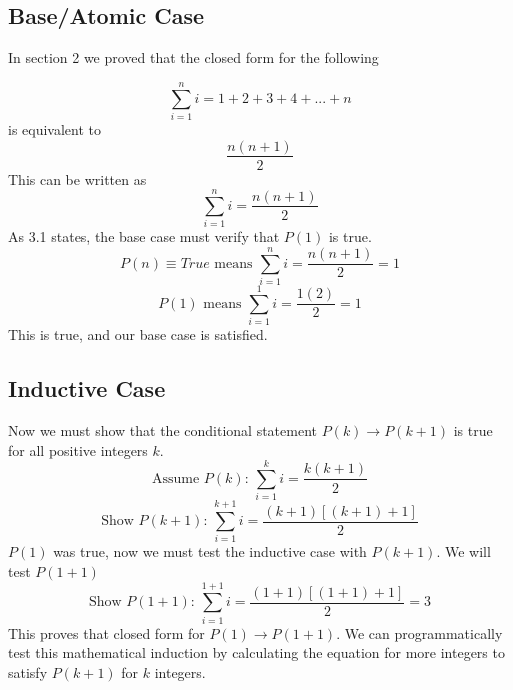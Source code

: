 \documentclass{article}
\begin{document}
\subsection{Base/Atomic Case}
In section 2 we proved that the closed form for the following

\begin{equation}
\sum_{i=1}^{n} i = 1 + 2 + 3 + 4 + ... + n
\end{equation}
\newline
is equivalent to
\begin{equation}
\frac{n(n+1)}{2}
\end{equation}
\newline
This can be written as 
\begin{equation}
\sum_{i=1}^{n} i = \frac{n(n+1)}{2}
\end{equation}
\newline
As 3.1 states, the base case must verify that $P(1)$ is true.
\newline
\newline
\begin{equation}
P(n) \equiv True \textrm{  means } \sum_{i=1}^{n} i = \frac{n(n+1)}{2} = 1
\end{equation}
\newline
\newline
\begin{equation}
P(1) \textrm{  means } \sum_{i=1}^{1} i = \frac{1(2)}{2} = 1
\end{equation}
\newline
\newline
This is true, and our base case is satisfied.

\subsection{Inductive Case}
Now we must show that the conditional statement $P(k) \rightarrow P(k+1)$ is true for all positive integers $k$.
\newline
\newline
\begin{equation}
\textrm{Assume  } P(k)\textrm{:   } \sum_{i=1}^{k} i = \frac{k(k+1)}{2}
\end{equation}
\newline
\newline
\begin{equation}
\textrm{Show  } P(k+1)\textrm{:   } \sum_{i=1}^{k+1} i = \frac{(k+1)[(k+1)+1]}{2}
\end{equation}
\newline
\newline
$P(1)$ was true, now we must test the inductive case with $P(k+1)$. We will test $P(1+1)$
\begin{equation}
\textrm{Show  } P(1+1)\textrm{:   } \sum_{i=1}^{1+1} i = \frac{(1+1)[(1+1)+1]}{2} = 3
\end{equation}
\newline
\newline
This proves that closed form for $P(1) \rightarrow P(1+1)$. We can programmatically test this mathematical induction by calculating the equation for more integers to satisfy $P(k+1)$ for $k$ integers.
\end{document}
